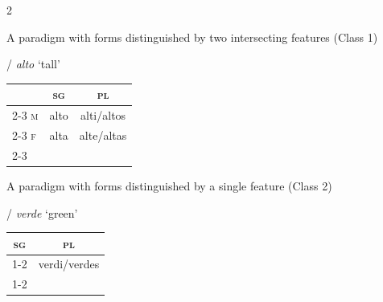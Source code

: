 \documentclass[output=paper,colorlinks,citecolor=brown]{langscibook}
\begin{document}
\hspace{-0.85cm} \begin{minipage}{\textwidth}
	\begin{multicols}{2}

	\begin{exe}
		\ex \label{04ex6}
		\begin{xlist}
			\ex \label{04ex6a} A paradigm with forms distinguished by two intersecting features (Class 1)
			
			\begin{center}
				/ \emph{alto} ‘tall’
				
				\begin{tabular}{lcc}
					& \textsc{sg} & \textsc{pl} \\
					\cline{2-3}
					\textsc{m} & \multicolumn{1}{|c}{alto} & \multicolumn{1}{|c|}{alti/altos} \\
					\cline{2-3}
					\textsc{f} & \multicolumn{1}{|c}{alta} & \multicolumn{1}{|c|}{alte/altas} \\
					\cline{2-3}
				\end{tabular}
			\end{center}
				
			\ex \label{04ex6b} A paradigm with forms distinguished by a single feature (Class 2)
			
			\begin{center}
				/ \emph{verde} ‘green’
				
				\begin{tabular}{cc}
					\textsc{sg} & \textsc{pl} \\
					\cline{1-2}
					\multicolumn{1}{|c}{verde} & \multicolumn{1}{|c|}{verdi/verdes} \\
					\cline{1-2}
					& \\
				\end{tabular}
			\end{center}
		\end{xlist}
	\end{exe}

	\end{multicols}
\end{minipage}

\bigskip
\end{document}
